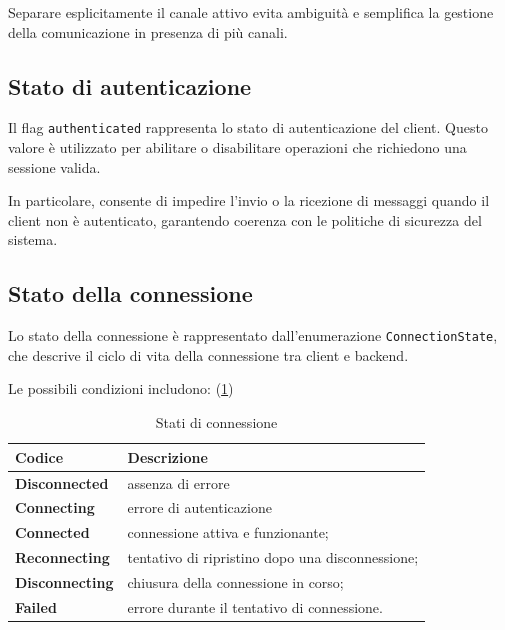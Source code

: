 \documentclass[a4paper, 11pt, twoside]{report}
\begin{document}
Separare esplicitamente il canale attivo evita ambiguità e semplifica la gestione della comunicazione in presenza di più canali.

\subsection{Stato di autenticazione}

Il flag \texttt{authenticated} rappresenta lo stato di autenticazione del client. Questo valore è utilizzato per abilitare o
disabilitare operazioni che richiedono una sessione valida.

In particolare, consente di impedire l'invio o la ricezione di messaggi quando il client non è autenticato, garantendo coerenza
con le politiche di sicurezza del sistema.

\subsection{Stato della connessione}

Lo stato della connessione è rappresentato dall'enumerazione \texttt{ConnectionState}, che descrive il ciclo di vita della
connessione tra client e backend.

Le possibili condizioni includono: (\ref{table:connection-states})

\begin{table}[h]
\centering
\begin{tabular}{@{}ll@{}}
\toprule
\textbf{Codice}                & \textbf{Descrizione}                             \\ \midrule
    \textbf{Disconnected}      & assenza di errore                                \\
    \textbf{Connecting}        & errore di autenticazione                         \\
    \textbf{Connected}         & connessione attiva e funzionante;                \\
    \textbf{Reconnecting}      & tentativo di ripristino dopo una disconnessione; \\
    \textbf{Disconnecting}     & chiusura della connessione in corso;             \\
    \textbf{Failed}   & errore durante il tentativo di connessione.               \\
\bottomrule
\end{tabular}
\caption{Stati di connessione}\label{table:connection-states}
\end{table}
\end{document}
